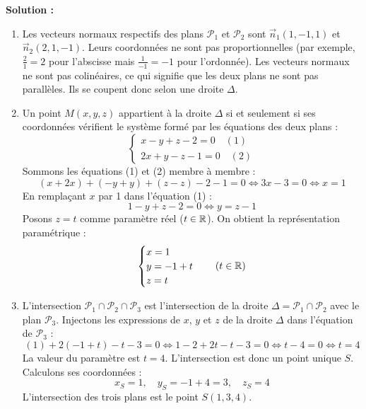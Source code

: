 \textbf{Solution :}
\begin{enumerate}
    \item Les vecteurs normaux respectifs des plans $\mathcal{P}_1$ et $\mathcal{P}_2$ sont $\vec{n}_1(1, -1, 1)$ et $\vec{n}_2(2, 1, -1)$.
    Leurs coordonnées ne sont pas proportionnelles (par exemple, $\frac{2}{1} = 2$ pour l'abscisse mais $\frac{1}{-1} = -1$ pour l'ordonnée). Les vecteurs normaux ne sont pas colinéaires, ce qui signifie que les deux plans ne sont pas parallèles. Ils se coupent donc selon une droite $\Delta$.
    
    \item Un point $M(x, y, z)$ appartient à la droite $\Delta$ si et seulement si ses coordonnées vérifient le système formé par les équations des deux plans :
    \[
    \begin{cases}
    x - y + z - 2 = 0 \quad (1) \\
    2x + y - z - 1 = 0 \quad (2)
    \end{cases}
    \]
    Sommons les équations (1) et (2) membre à membre :
    \[
    (x + 2x) + (-y + y) + (z - z) - 2 - 1 = 0 \iff 3x - 3 = 0 \iff x = 1
    \]
    En remplaçant $x$ par 1 dans l'équation (1) :
    \[
    1 - y + z - 2 = 0 \iff y = z - 1
    \]
    Posons $z = t$ comme paramètre réel ($t \in \mathbb{R}$). On obtient la représentation paramétrique :
    \[
    \begin{cases}
    x = 1 \\
    y = -1 + t \\
    z = t
    \end{cases} \quad (t \in \mathbb{R})
    \]
    
    \item L'intersection $\mathcal{P}_1 \cap \mathcal{P}_2 \cap \mathcal{P}_3$ est l'intersection de la droite $\Delta = \mathcal{P}_1 \cap \mathcal{P}_2$ avec le plan $\mathcal{P}_3$.
    Injectons les expressions de $x$, $y$ et $z$ de la droite $\Delta$ dans l'équation de $\mathcal{P}_3$ :
    \[
    (1) + 2(-1 + t) - t - 3 = 0 \iff 1 - 2 + 2t - t - 3 = 0 \iff t - 4 = 0 \iff t = 4
    \]
    La valeur du paramètre est $t = 4$. L'intersection est donc un point unique $S$.
    Calculons ses coordonnées :
    \[
    x_S = 1, \quad y_S = -1 + 4 = 3, \quad z_S = 4
    \]
    L'intersection des trois plans est le point $S(1, 3, 4)$.
\end{enumerate}

